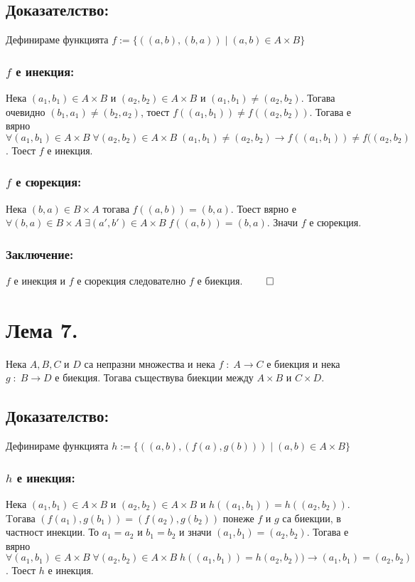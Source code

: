 \documentclass[a4paper, 12pt, oneside]{article}
\begin{document}
\subsection*{Доказателство:}
Дефинираме функцията \(f := \{((a, b), (b, a)) \; | \; (a, b) \in A \times B\}\)
\subsubsection*{\(f\) е инекция:}
Нека \((a_1, b_1) \in A \times B\) и \((a_2, b_2) \in A \times B\) и \((a_1, b_1) \neq (a_2, b_2)\).
Тогава очевидно \((b_1, a_1) \neq (b_2, a_2)\), тоест \(f((a_1, b_1)) \neq f((a_2, b_2))\).
Тогава е вярно \(\forall (a_1, b_1) \in A \times B \; \forall (a_2, b_2) \in A \times B \; (a_1, b_1) \neq (a_2, b_2) \longrightarrow f((a_1, b_1)) \neq f((a_2, b_2)\).
Тоест \(f\) е инекция.
\subsubsection*{\(f\) е сюрекция:}
Нека \((b, a) \in B \times A\) тогава \(f((a, b)) = (b, a)\).
Тоест вярно е \(\forall (b, a) \in B \times A \; \exists (a', b') \in A \times B \; f((a, b)) = (b, a)\).
Значи \(f\) е сюрекция.
\subsubsection*{Заключение:}
\(f\) е инекция и \(f\) е сюрекция следователно \(f\) е биекция. \(\qed\)
\section*{Лема 7.}
Нека \(A, B, C\) и \(D\) са непразни множества и
нека \(f \; : \; A \to C\) е биекция и нека \(g \; : \; B \to D\) е биекция.
Тогава съществува биекции между \(A \times B\) и \(C \times D\).
\subsection*{Доказателство:}
Дефинираме функцията \(h := \{((a, b), (f(a), g(b))) \; | \; (a, b) \in A \times B\}\)
\subsubsection*{\(h\) е инекция:}
Нека \((a_1, b_1) \in A \times B\) и \((a_2, b_2) \in A \times B\) и \(h((a_1, b_1)) = h((a_2, b_2))\).
Tогава \((f(a_1), g(b_1)) = (f(a_2), g(b_2))\) понеже \(f\) и \(g\) са биекции, в частност инекции.
То \(a_1 = a_2\) и \(b_1 = b_2\) и значи \((a_1, b_1) = (a_2, b_2)\). Тогава е вярно \\
\(\forall (a_1, b_1) \in A \times B \; \forall (a_2, b_2) \in A \times B \; h((a_1, b_1)) = h(a_2, b_2)) \longrightarrow (a_1, b_1) = (a_2, b_2)\).
Тоест \(h\) е инекция.
\end{document}
